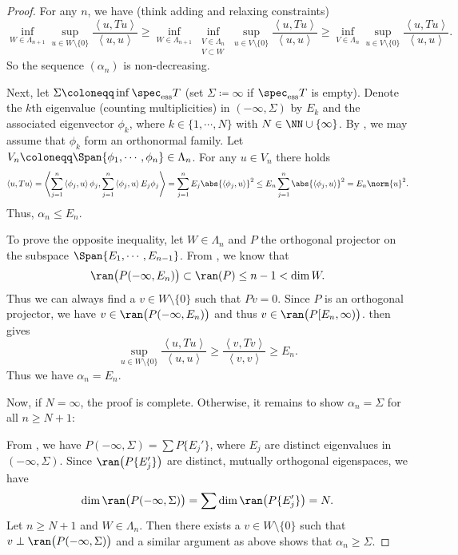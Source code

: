 \documentclass[oneside,reqno,letterpaper]{amsart}
\newcommand{\essspec}{\spec_{\text{ess}}}
\begin{document}
\begin{proof}
  For any \(n\), we have (think adding and relaxing constraints)
  \[
    \inf_{W \in \Lambda_{n + 1}} \sup_{u \in W \setminus \{0\}} \frac{\left< u, Tu \right>}{\left< u, u \right>} 
    \geq \inf_{W \in \Lambda_{n + 1}} \inf_{\substack{V \in \Lambda_n\\ V\subset W}} \sup_{u \in V \setminus \{0\}} \frac{\left< u, Tu \right>}{\left< u, u \right>} 
    \geq \inf_{V \in \Lambda_n} \sup_{u \in V \setminus \{0\}} \frac{\left< u, Tu \right>}{\left< u, u \right>} . 
  \]
  So the sequence \((\alpha_n)\) is non-decreasing. 

  Next, let \(\Sigma \coloneqq \inf \essspec T\) (set \(\Sigma \coloneqq \infty\) if \(\essspec T\) is empty).
  Denote the \(k\)th eigenvalue (counting multiplicities) in \((-\infty, \Sigma)\) by \(E_k\) and the associated eigenvector \(\phi_k\), where \(k \in \{1, \cdots, N\}\) with \(N \in \NN \cup \{\infty\}\). 
  By , we may assume that \(\phi_k\) form an orthonormal family. 
  Let \(V_n \coloneqq \Span \{\phi_1, \cdots, \phi_n\} \in \Lambda_n\).
  For any \(u \in V_n\) there holds
  \begin{align*}
    \left< u, Tu \right>
    = \left< \sum_{j=1}^{n} \left< \phi_j, u \right> \phi_j, \sum_{j=1}^{n} \left< \phi_j, u \right> E_j \phi_j \right>
    = \sum_{j=1}^{n} E_j \abs{\left< \phi_j, u \right>}^2 
    \leq E_n \sum_{j=1}^{n} \abs{\left< \phi_j, u \right>}^2 
    =  E_n \norm{u}^2 . 
  \end{align*}
  Thus, \(\alpha_n \leq E_n\). 

  To prove the opposite inequality, let \(W \in \Lambda_n\) and \(P\) the orthogonal projector on the subspace \(\Span \{E_1, \cdots, E_{n - 1}\}\). 
  From , we know that 
  \[
    \ran\big(P(-\infty, E_n)\big) \subset \ran(P) \leq n - 1 < \dim W. 
  \]
  Thus we can always find a \(v \in W \setminus \{0\}\) such that \(P v = 0\). 
  Since \(P\) is an orthogonal projector, we have \(v \in \ran\big(P(-\infty, E_n)\big)\) and thus \(v \in \ran\big(P[E_n, \infty)\big)\). 
   then gives 
  \[
    \sup_{u \in W \setminus \{0\}} \frac{\left< u, T u \right>}{\left< u, u \right>}
    \geq \frac{\left< v, Tv \right>}{\left< v, v \right>}
    \geq E_n. 
  \] 
  Thus we have \(\alpha_n = E_n\). 

  Now, if \(N = \infty\), the proof is complete. 
  Otherwise, it remains to show \(\alpha_n = \Sigma\) for all \(n \geq N + 1\): 

  From , we have \(P(-\infty, \Sigma) = \sum P \{E_j'\}\), where \(E_j\) are distinct eigenvalues in \((-\infty, \Sigma)\). 
  Since \(\ran\big(P \{E_j'\} \big)\) are distinct, mutually orthogonal eigenspaces, we have 
  \[
    \dim \ran\big(P(-\infty, \Sigma)\big)
    = \sum \dim \ran\big(P\{E_j'\}\big)
    = N .
  \] 
  Let \(n \geq N + 1\) and \(W \in \Lambda_{n}\). 
  Then there exists a \(v \in W \setminus \{0\}\) such that \(v \perp \ran\big(P(-\infty, \Sigma)\big)\) and a similar argument as above shows that \(\alpha_n \geq \Sigma\). 


\end{proof}
\end{document}
